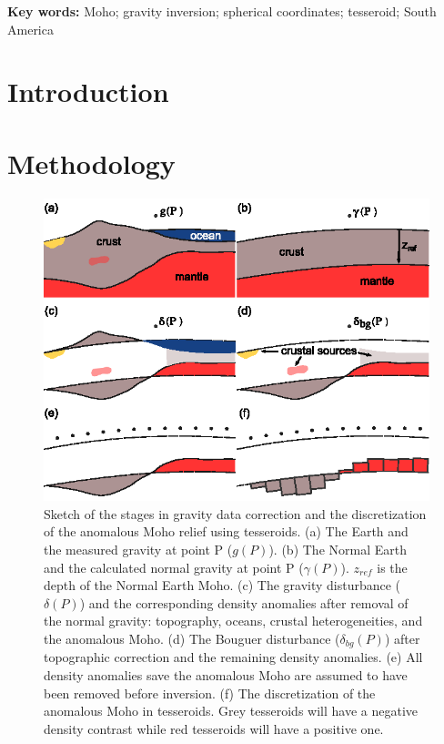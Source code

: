 \documentclass[extra]{gji}
\title[]{\Title}
\author[]{
    Leonardo Uieda$^{1,2}$,
    Valéria C. F. Barbosa$^{2}$
    \\
    $^1$Universidade do Estado do Rio de Janeiro, Rio de Janeiro, Brazil.
    e-mail: leouieda@gmail.com
    \\
    $^2$Observatório Nacional, Rio de Janeiro, Brazil.
}
\newcommand{\Keywords}{
        Moho;
        gravity inversion;
        spherical coordinates;
        tesseroid;
        South America
}
\begin{document}
\maketitle


\begin{abstract}
\end{abstract}

\noindent\textbf{Key words:} \Keywords


\section{Introduction}

\lipsum[1-7]

\section{Methodology}

\begin{figure}
    \centering
    \includegraphics{figures/problem-concept}
    \caption{
        Sketch of the stages in gravity data correction and
        the discretization of the anomalous Moho relief using tesseroids.
        (a) The Earth and the measured gravity at point P ($g(P)$).
        (b) The Normal Earth and the calculated normal gravity at point P
        ($\gamma(P)$). $z_{ref}$ is the depth of the Normal Earth Moho.
        (c) The gravity disturbance ($\delta(P)$) and
        the corresponding density anomalies after removal of the normal gravity:
        topography, oceans, crustal heterogeneities, and the anomalous Moho.
        (d) The Bouguer disturbance ($\delta_{bg}(P)$) after topographic
        correction and the remaining density anomalies.
        (e) All density anomalies save the anomalous Moho are assumed to have
        been removed before inversion.
        (f) The discretization of the anomalous Moho in tesseroids. Grey
        tesseroids will have a negative density contrast while red tesseroids
        will have a positive one.
    }
    \label{fig:anomalysketch}
\end{figure}
\end{document}
